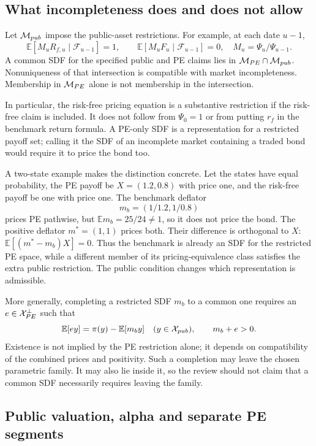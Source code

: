 \documentclass[11pt]{article}
\newcommand{\E}{\mathbb{E}}
\theoremstyle{plain}
\theoremstyle{definition}
\begin{document}
\subsection{What incompleteness does and does not allow}

Let $\mathcal{M}_{pub}$ impose the public-asset restrictions. For example, at each date $u-1$,
\[
\E[M_uR_{f,u}\mid\mathcal F_{u-1}]=1,\qquad
\E[M_uF_u\mid\mathcal F_{u-1}]=0,
\quad M_u=\Psi_u/\Psi_{u-1}.
\]
A common SDF for the specified public and PE claims lies in $\mathcal{M}_{PE}\cap\mathcal{M}_{pub}$. Nonuniqueness of that intersection is compatible with market incompleteness. Membership in $\mathcal{M}_{PE}$ alone is not membership in the intersection.

In particular, the risk-free pricing equation is a substantive restriction if the risk-free claim is included. It does not follow from $\Psi_0=1$ or from putting $r_f$ in the benchmark return formula. A PE-only SDF is a representation for a restricted payoff set; calling it the SDF of an incomplete market containing a traded bond would require it to price the bond too.

A two-state example makes the distinction concrete. Let the states have equal probability, the PE payoff be $X=(1.2,0.8)$ with price one, and the risk-free payoff be one with price one. The benchmark deflator
\[
m_b=(1/1.2,1/0.8)
\]
prices PE pathwise, but $\E m_b=25/24\ne1$, so it does not price the bond. The positive deflator $m^\ast=(1,1)$ prices both. Their difference is orthogonal to $X$:
$\E[(m^\ast-m_b)X]=0$. Thus the benchmark is already an SDF for the restricted PE space, while a different member of its pricing-equivalence class satisfies the extra public restriction. The public condition changes which representation is admissible.

More generally, completing a restricted SDF $m_b$ to a common one requires an $e\in\mathcal{X}_{PE}^{\perp}$ such that
\[
\E[e y]=\pi(y)-\E[m_b y]\quad(y\in\X_{pub}),\qquad m_b+e>0.
\]
Existence is not implied by the PE restriction alone; it depends on compatibility of the combined prices and positivity. Such a completion may leave the chosen parametric family. It may also lie inside it, so the review should not claim that a common SDF necessarily requires leaving the family.

\subsection{Public valuation, alpha and separate PE segments}
\end{document}
